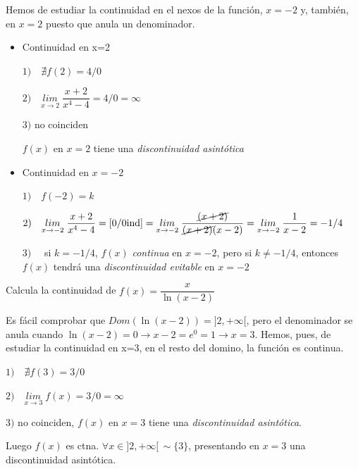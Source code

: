 	\begin{proofw}\renewcommand{\qedsymbol}{$\diamond$}
	
	Hemos de estudiar la continuidad en el nexos de la función, $x=-2$ y, también, en $x=2$ puesto que anula un denominador.
	
	\begin{itemize}
		\item Continuidad en x=2
		
		$1)\quad \nexists f(2)=4/0$
		
		$2)\quad \underset {x\to 2}{lim}\;{\dfrac {x+2}{x^4-4}}=4/0=\infty$
		
		$3)$ no coinciden
		
		$f(x)$ en $x=2$ tiene una \emph{discontinuidad asintótica}
		
		\item Continuidad en $x=-2$
		
		$1)\quad f(-2)=k$
		
		$2) \quad \underset {x\to -2}{lim}\;{\dfrac {x+2}{x^4-4}}=[0/0 \mbox{ind}]=\underset {x\to -2}{lim}\;{\dfrac {\cancel{(x+2)}}{\cancel{(x+2)}(x-2)}}=\underset {x\to -2}{lim}\;{\dfrac {1}{x-2}}=-1/4$
		
		$3) \quad $ si $k=-1/4$, $f(x)$ \emph{continua} en $x=-2$, pero si $k\neq -1/4$, entonces $f(x)$ tendrá una \emph{discontinuidad evitable} en $x=-2$
		
	\end{itemize}
		
	\end{proofw}
	
	\begin{ejre} Calcula la continuidad de $f(x)=\dfrac {x}{\ln (x-2)}$
		
	\end{ejre}
	
	\begin{proofw}\renewcommand{\qedsymbol}{$\diamond$}
	
	Es fácil comprobar que $Dom(\ln (x-2))=]2,+\infty[$, pero el denominador se anula cuando $\ln(x-2)=0 \to x-2=e^0=1 \to x=3$. Hemos, pues, de estudiar la continuidad en x=3, en el resto del domino, la función es continua.
	
	$1)\quad \nexists f(3)=3/0$
	
	$2)\quad \underset {x\to 3}{lim}\; {f(x)}=3/0=\infty$
	
	$3) $ no coinciden, $f(x)$ en $x=3$ tiene una \emph{discontinuidad asintótica}.
	
	Luego $f(x)$ es ctna. $\forall x \in ]2,+\infty[\, \sim \{3\}$, presentando en $x=3$ una discontinuidad asintótica. 
	
		
	\end{proofw}
	
